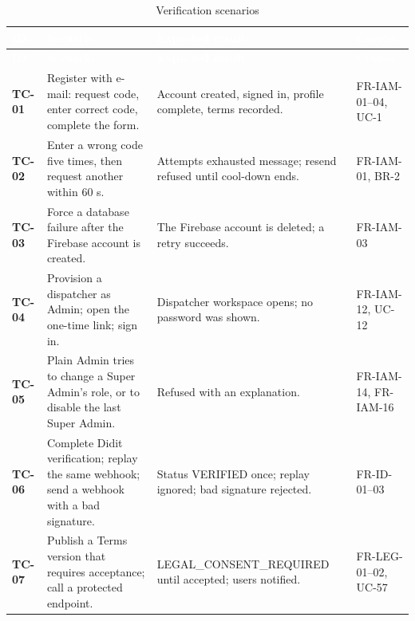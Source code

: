 {\tabfont\rowband
\begin{longtable}{@{}>{\raggedright\arraybackslash}p{}>{\raggedright\arraybackslash}p{}>{\raggedright\arraybackslash}p{}>{\raggedright\arraybackslash}p{}@{}}
\caption{Verification scenarios}\label{tab:tests-scenarios}\\
\rowcolor{najdanavy}\textcolor{white}{\sffamily\bfseries\small ID} & \textcolor{white}{\sffamily\bfseries\small Scenario} & \textcolor{white}{\sffamily\bfseries\small Expected result} & \textcolor{white}{\sffamily\bfseries\small Covers}\\
\endfirsthead
\rowcolor{najdanavy}\textcolor{white}{\sffamily\bfseries\small ID} & \textcolor{white}{\sffamily\bfseries\small Scenario} & \textcolor{white}{\sffamily\bfseries\small Expected result} & \textcolor{white}{\sffamily\bfseries\small Covers}\\
\endhead
\bottomrule\endlastfoot
\textbf{TC-01} & Register with e-mail: request code, enter correct code, complete the form. & Account created, signed in, profile complete, terms recorded. & FR-IAM-01--04, UC-1\\
\textbf{TC-02} & Enter a wrong code five times, then request another within 60 s. & Attempts exhausted message; resend refused until cool-down ends. & FR-IAM-01, BR-2\\
\textbf{TC-03} & Force a database failure after the Firebase account is created. & The Firebase account is deleted; a retry succeeds. & FR-IAM-03\\
\textbf{TC-04} & Provision a dispatcher as Admin; open the one-time link; sign in. & Dispatcher workspace opens; no password was shown. & FR-IAM-12, UC-12\\
\textbf{TC-05} & Plain Admin tries to change a Super Admin’s role, or to disable the last Super Admin. & Refused with an explanation. & FR-IAM-14, FR-IAM-16\\
\textbf{TC-06} & Complete Didit verification; replay the same webhook; send a webhook with a bad signature. & Status VERIFIED once; replay ignored; bad signature rejected. & FR-ID-01--03\\
\textbf{TC-07} & Publish a Terms version that requires acceptance; call a protected endpoint. & 403 LEGAL\_\allowbreak{}CONSENT\_\allowbreak{}REQUIRED until accepted; users notified. & FR-LEG-01--02, UC-57\\

\end{longtable}}
